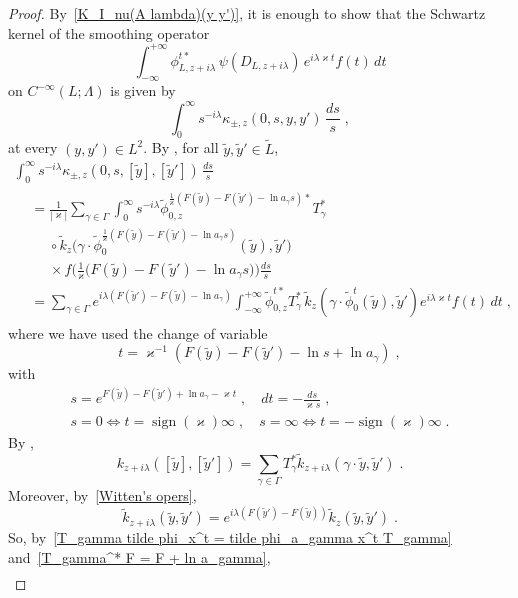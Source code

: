 \documentclass{memo-l}
\theoremstyle{plain}
\theoremstyle{definition}
\theoremstyle{remark}
\newcommand{\sign}{\operatorname{sign}}
\numberwithin{section}{chapter}
\numberwithin{equation}{section}%
\begin{document}
\begin{proof}
By~\eqref{K_I_nu(A lambda)(y y')}, it is enough to show that the Schwartz kernel of the smoothing operator
\[
\int_{-\infty}^{+\infty}\phi_{L,z+i\lambda}^{t*}\,\psi(D_{L,z+i\lambda})\,e^{i\lambda\varkappa t}f(t)\,dt
\]
on $C^{-\infty}(L;\Lambda)$ is given by
\[
\int_0^\infty s^{-i\lambda}\kappa_{\pm,z}(0,s,y,y')\,\frac{ds}{s}\;,
\]
 at every $(y,y')\in L^2$. By , for all $\tilde y,\tilde y'\in\widetilde L$,
\begin{multline*}
\int_0^\infty s^{-i\lambda}\kappa_{\pm,z}(0,s,[\tilde y],[\tilde y'])\,\frac{ds}{s}\\
\begin{aligned}
&= \frac{1}{|\varkappa|}\sum_{\gamma\in \Gamma} \int_0^\infty
s^{-i\lambda} \tilde\phi_{0,z}^{\frac{1}{\varkappa}(F(\tilde y)-F(\tilde y')-\ln a_\gamma s)*}T_\gamma^*\\
&\phantom{=\text{}}\text{}\circ\tilde k_z\Big(\gamma\cdot \tilde\phi^{\frac{1}{\varkappa}(F(\tilde y)
-F(\tilde y')-\ln a_\gamma s)}_{0}(\tilde y),\tilde y'\Big) \\ 
&\phantom{=\text{}}\text{}\times f\Big(\frac{1}{\varkappa}\Big(F(\tilde y)
-F(\tilde y')-\ln a_\gamma s\Big)\Big)\frac{ds}{s}\\
&=\sum_{\gamma\in \Gamma} e^{i\lambda(F(\tilde y')-F(\tilde y)-\ln a_\gamma)} 
\int_{-\infty}^{+\infty}\tilde\phi_{0,z}^{t*}T_\gamma^*\,
\tilde k_z(\gamma\cdot \tilde\phi_0^t(\tilde y),\tilde y')e^{i\lambda\varkappa t}f(t)\,dt\;,
\end{aligned}
\end{multline*}
where we have used the change of variable
\[
t=\varkappa^{-1}(F(\tilde y)-F(\tilde y')-\ln s+\ln a_\gamma)\;,
\]
with
\begin{gather*}
s=e^{F(\tilde y)-F(\tilde y')+\ln a_\gamma-\varkappa t}\;,\quad dt=-\frac{ds}{\varkappa s}\;,\\
s=0\Leftrightarrow t=\sign(\varkappa)\infty\;,
\quad s=\infty\Leftrightarrow t=-\sign(\varkappa)\infty\;.
\end{gather*}
By ,
\[
k_{z+i\lambda}([\tilde y],[\tilde y']) =\sum_{\gamma\in \Gamma} 
T_\gamma^*\tilde k_{z+i\lambda}(\gamma\cdot\tilde y,\tilde y')\;.
\]
Moreover, by~\eqref{Witten's opers},
\[
\tilde k_{z+i\lambda}(\tilde y,\tilde y')= e^{i\lambda (F(\tilde y')-F(\tilde y))}
\tilde k_z(\tilde y,\tilde y')\;.
\]
So, by~\eqref{T_gamma tilde phi_x^t = tilde phi_a_gamma x^t T_gamma} and~\eqref{T_gamma^* F = F + ln a_gamma},
\begin{multline*}

\end{multline*}
\end{proof}
\end{document}
